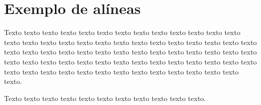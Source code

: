 

\section{Exemplo de alíneas}\label{sec:exemplo-de-algoritmos-e-figuras}

    Texto texto texto texto texto texto texto texto texto texto texto texto texto texto texto texto texto texto texto texto texto texto texto texto texto texto texto texto texto texto texto texto texto texto texto texto texto texto texto texto texto texto texto texto texto texto texto texto texto texto texto texto texto texto texto texto texto texto texto texto texto texto texto texto texto texto texto texto texto.


    Texto texto texto texto texto texto texto texto texto texto texto.


